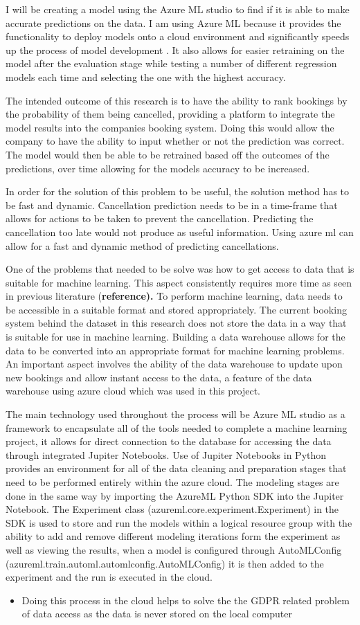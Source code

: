 I will be creating a model using the Azure ML studio to find if it is able to make accurate predictions on the data. I am using Azure ML because it provides the functionality to deploy models onto a cloud environment and significantly speeds up the process of model development . It also allows for easier retraining on the model after the evaluation stage while testing a number of different regression models each time and selecting the one with the highest accuracy.

The intended outcome of this research is to have the ability to rank bookings by the probability of them being cancelled, providing a platform to integrate the model results into the companies booking system. Doing this would allow the company to have the ability to input whether or not the prediction was correct. The model would then be able to be retrained based off the outcomes of the predictions, over time allowing for the models accuracy to be increased. 

In order for the solution of this problem to be useful, the solution method has to be fast and dynamic. Cancellation prediction needs to be in a time-frame that allows for actions to be taken to prevent the cancellation. Predicting the cancellation too late would not produce as useful information. Using azure ml can allow for a fast and dynamic method of predicting cancellations. 

One of the problems that needed to be solve was how to get access to data that is suitable for machine learning. This aspect consistently requires more time as seen in previous literature (\textbf{reference).} To perform machine learning, data needs to be accessible in a suitable format and stored appropriately. The current booking system behind the dataset in this research does not store the data in a way that is suitable for use in machine learning. Building a data warehouse allows for the data to be converted into an appropriate format for machine learning problems. An important aspect involves the ability of the data warehouse to update upon new bookings and allow instant access to the data, a feature of the data warehouse using azure cloud which was used in this project. 

The main technology used throughout the process will be Azure ML studio as a framework to encapsulate all of the tools needed to complete a machine learning project, it allows for direct connection to the database for accessing the data through integrated Jupiter Notebooks. Use of Jupiter Notebooks in Python provides an environment for all of the data cleaning and preparation stages that need to be performed entirely within the azure cloud. The modeling stages are done in the same way by importing the AzureML Python SDK into the Jupiter Notebook. The Experiment class (azureml.core.experiment.Experiment) in the SDK is used to store and run the models within a logical resource group with the ability to add and remove different modeling iterations form the experiment as well as viewing the results, when a model is configured through AutoMLConfig (azureml.train.automl.automlconfig.AutoMLConfig) it is then added to the experiment and the run is executed in the cloud. 

\begin{itemize}
\item Doing this process in the cloud helps to solve the the GDPR related problem of data access as the data is never stored on the local computer 
\end{itemize}
